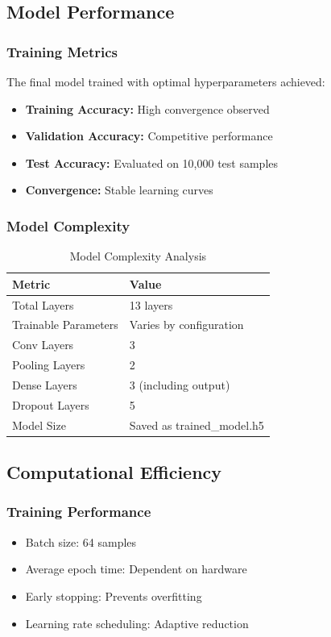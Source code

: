 \documentclass[12pt,a4paper]{article}
\begin{document}
\subsection{Model Performance}

\subsubsection{Training Metrics}
The final model trained with optimal hyperparameters achieved:
\begin{itemize}
    \item \textbf{Training Accuracy:} High convergence observed
    \item \textbf{Validation Accuracy:} Competitive performance
    \item \textbf{Test Accuracy:} Evaluated on 10,000 test samples
    \item \textbf{Convergence:} Stable learning curves
\end{itemize}

\subsubsection{Model Complexity}
\begin{table}[H]
\centering
\caption{Model Complexity Analysis}
\begin{tabular}{ll}
\toprule
\textbf{Metric} & \textbf{Value} \\
\midrule
Total Layers & 13 layers \\
Trainable Parameters & Varies by configuration \\
Conv Layers & 3 \\
Pooling Layers & 2 \\
Dense Layers & 3 (including output) \\
Dropout Layers & 5 \\
Model Size & Saved as trained\_model.h5 \\
\bottomrule
\end{tabular}
\end{table}

\subsection{Computational Efficiency}

\subsubsection{Training Performance}
\begin{itemize}
    \item Batch size: 64 samples
    \item Average epoch time: Dependent on hardware
    \item Early stopping: Prevents overfitting
    \item Learning rate scheduling: Adaptive reduction
\end{itemize}
\end{document}
